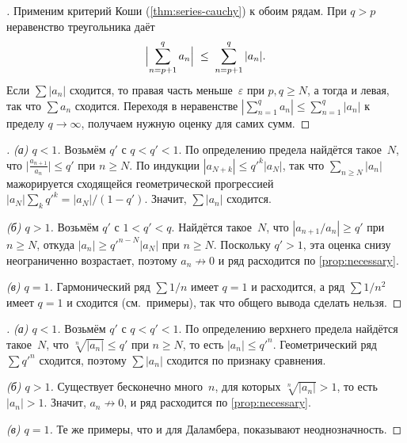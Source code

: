 \begin{proof}[]
Применим критерий Коши (\cref{thm:series-cauchy}) к обоим рядам.
При $q > p$ неравенство треугольника даёт
\[
  \Bigl| \sum_{n=p+1}^{q} a_n \Bigr| \;\le\; \sum_{n=p+1}^{q} |a_n|.
\]
Если $\sum |a_n|$ сходится, то правая часть меньше~$\varepsilon$
при $p, q \ge N$, а тогда и левая, так что $\sum a_n$ сходится.
Переходя в неравенстве
$|\sum_{n=1}^{q} a_n| \le \sum_{n=1}^{q} |a_n|$ к пределу
$q \to \infty$, получаем нужную оценку для самих сумм.
\end{proof}

\begin{proof}[]
\emph{(а) $q < 1$.} Возьмём $q'$ с $q < q' < 1$. По определению
предела найдётся такое~$N$, что
$\bigl|\tfrac{a_{n+1}}{a_n}\bigr| \le q'$ при $n \ge N$. По индукции
$|a_{N+k}| \le q'^k |a_N|$, так что $\sum_{n \ge N} |a_n|$
мажорируется сходящейся геометрической прогрессией
$|a_N| \sum_k q'^k = |a_N|/(1 - q')$. Значит, $\sum |a_n|$ сходится.

\emph{(б) $q > 1$.} Возьмём $q'$ с $1 < q' < q$. Найдётся такое~$N$,
что $|a_{n+1}/a_n| \ge q'$ при $n \ge N$, откуда
$|a_n| \ge q'^{n - N}|a_N|$ при $n \ge N$. Поскольку $q' > 1$, эта
оценка снизу неограниченно возрастает, поэтому $a_n \not\to 0$ и ряд
расходится по \cref{prop:necessary}.

\emph{(в) $q = 1$.} Гармонический ряд $\sum 1/n$ имеет $q = 1$ и
расходится, а ряд $\sum 1/n^2$ имеет $q = 1$ и сходится (см.\
примеры), так что общего вывода сделать нельзя.
\end{proof}

\begin{proof}[]
\emph{(а) $q < 1$.} Возьмём $q'$ с $q < q' < 1$. По определению
верхнего предела найдётся такое~$N$, что $\sqrt[n]{|a_n|} \le q'$
при $n \ge N$, то есть $|a_n| \le q'^n$. Геометрический ряд
$\sum q'^n$ сходится, поэтому $\sum |a_n|$ сходится по признаку
сравнения.

\emph{(б) $q > 1$.} Существует бесконечно много~$n$, для которых
$\sqrt[n]{|a_n|} > 1$, то есть $|a_n| > 1$. Значит, $a_n \not\to 0$,
и ряд расходится по \cref{prop:necessary}.

\emph{(в) $q = 1$.} Те же примеры, что и для Даламбера, показывают
неоднозначность.
\end{proof}

